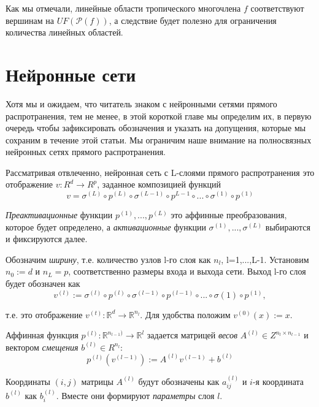 \documentclass[russian]{lecture-notes}
\begin{document}
	Как мы отмечали, линейные области тропического многочлена $f$ соответствуют вершинам на $UF(\mathcal{P}(f))$, а следствие будет полезно для ограничения количества линейных областей.
	
	\section{Нейронные сети}
	
	Хотя мы и ожидаем, что читатель знаком с нейронными сетями прямого распротранения, тем не менее, в этой короткой главе мы определим их, в первую очередь чтобы зафиксировать обозначения и указать на допущения, которые мы сохраним в течение этой статьи. Мы ограничим наше внимание на полносвязных нейронных сетях прямого распротранения.
	
	Рассматривая отвлеченно, нейронная сеть с L-слоями прямого распротранения это отображение $v : R^d \to R^p$, заданное композицией функций
	\begin{equation*}
	v = \sigma^{(L)} \circ p^{(L)} \circ \sigma^{(L-1)} \circ p^{L-1} \circ ... \circ \sigma^{(1)} \circ p^{(1)}
	\end{equation*}
	
	\textit{Преактивационные} функции $p^{(1)},...,p^{(L)}$ это аффинные преобразования, которое будет определено, а \textit{активационные} функции $\sigma^{(1)},...,\sigma^{(L)}$ выбираются и фиксируются далее.
	
	Обозначим \textit{ширину}, т.е. количество узлов l-го слоя как $n_l$, l=1,...,L-1. Установим $n_0 := d$ и $n_L = p$, соответственно размеры входа и выхода сети. Выход l-го слоя будет обозначен как
	\begin{equation*}
	v^{(l)} := \sigma^{(l)} \circ p^{(l)} \circ \sigma^{(l-1)} \circ p^{(l-1)} \circ ... \circ \sigma{(1)} \circ p^{(1)},
	\end{equation*}
	
	т.е. это отображение $v^{(t)} : \mathbb{R}^d \to \mathbb{R}^{n_l}$. Для удобства положим $v^{(0)}(x) := x$.
	
	Аффинная функция $p^{(l)} : \mathbb{R}^{n_{l-1})} \to \mathbb{R}^l$ задается матрицей \textit{весов} $A^{(l)} \in Z^{n_l \times n_{l-1}}$ и вектором \textit{смещения} $b^{(l)} \in R^{n_l}$:
	\begin{equation*}
	p^{(l)}(v^{(l-1)}) := A^{(l)}v^{(l-1)} + b^{(l)}
	\end{equation*}
	
	Координаты $(i, j)$ матрицы $A^{(l)}$ будут обозначены как $a_{ij}^{(l)}$ и $i$-я координата $b^{(l)}$ как $b_{i}^{(l)}$. Вместе они формируют \textit{параметры} слоя $l$.
	
\end{document}
